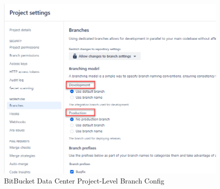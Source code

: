 \begin{figure}[h]
    \includegraphics[width=\textwidth]{graphics/bbdc-branch-config.png}
    \caption{BitBucket Data Center Project-Level Branch Config}
    \label{fig:bbdc-branch-config}
\end{figure}

